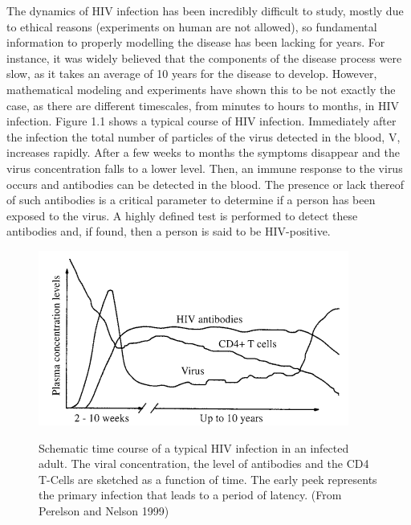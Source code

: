 The dynamics of HIV infection has been incredibly difficult to study, mostly due to ethical reasons (experiments on human are not allowed), so fundamental information to properly modelling the disease has been lacking for years. For instance, it was widely believed that the components of the disease process were slow, as it takes an average of 10 years for the disease to develop. However, mathematical modeling and experiments have shown this to be not exactly the case, as there are different timescales, from minutes to hours to months, in HIV infection. Figure 1.1 shows a typical course of HIV infection. Immediately after the infection the total number of particles of the virus detected in the blood, V, increases rapidly. After a few weeks to months the symptoms disappear and the virus concentration falls to a lower level. Then, an immune response to the virus occurs and antibodies can be detected in the blood. The presence or lack thereof of such antibodies is a critical parameter to determine if a person has been exposed to the virus. A highly defined test is performed to detect these antibodies and, if found, then a person is said to be HIV-positive.

\begin{figure}[H]
	{\includegraphics[scale=0.85]{HIV-Infection-Timescale.png}}
	\caption{Schematic time course of a typical HIV infection in an infected adult. The viral concentration, the level of antibodies and the CD4 T-Cells are sketched as a function of time. The early peek represents the primary infection that leads to a period of latency. (From Perelson and Nelson 1999)}
\end{figure}

